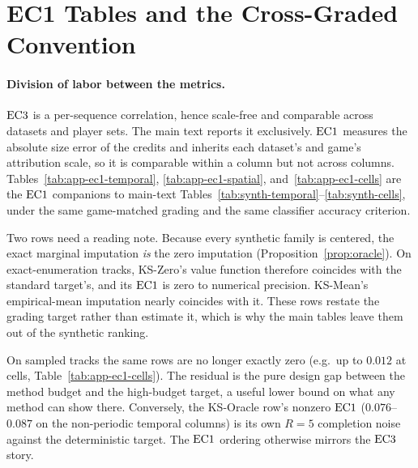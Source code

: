 \section{EC1 Tables and the Cross-Graded Convention}
\label{app:ec1_table}
\label{app:cond_tables}

\paragraph{Division of labor between the metrics.}
$\mathrm{EC3}$ is a per-sequence correlation, hence scale-free and comparable
across datasets and player sets.  The main text reports it exclusively.
$\mathrm{EC1}$ measures the absolute size error of the credits and inherits each
dataset's and game's attribution scale, so it is comparable within a column
but not across columns.  Tables~\ref{tab:app-ec1-temporal},
\ref{tab:app-ec1-spatial}, and~\ref{tab:app-ec1-cells} are the $\mathrm{EC1}$
companions to main-text Tables~\ref{tab:synth-temporal}--\ref{tab:synth-cells},
under the same game-matched grading and the same classifier accuracy
criterion.





Two rows need a reading note.  Because every synthetic family is centered,
the exact marginal imputation \emph{is} the zero imputation
(Proposition~\ref{prop:oracle}).  On exact-enumeration tracks, KS-Zero's
value function therefore coincides with the standard target's, and its
$\mathrm{EC1}$ is zero to numerical precision.  KS-Mean's empirical-mean imputation
nearly coincides with it.  These rows restate the grading target rather
than estimate it, which is why the main tables leave them out of the
synthetic ranking.

On sampled tracks the same rows are no longer exactly zero (e.g.\ up to
$0.012$ at cells, Table~\ref{tab:app-ec1-cells}).  The residual is the pure
design gap between the method budget and the high-budget target, a useful
lower bound on what any method can show there.  Conversely, the KS-Oracle
row's nonzero $\mathrm{EC1}$ ($0.076$--$0.087$ on the non-periodic temporal
columns) is its own $R{=}5$ completion noise against the deterministic
target.  The $\mathrm{EC1}$ ordering otherwise mirrors the $\mathrm{EC3}$ story.

